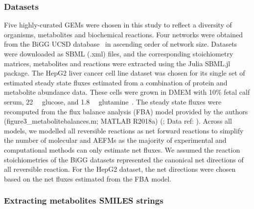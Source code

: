 \documentclass[12pt]{article}
\begin{document}
\subsubsection*{Datasets}

\nocite{OrthJeffreyD2010RaUo}
\nocite{OrthJeffreyD2010RaUoDATASET}
\nocite{BeckerScottA2005Grot}
\nocite{BeckerScottA2005GrotDATASET}
\nocite{BordbarAarash2011iApd}
\nocite{BordbarAarash2011iApdDATASET}
\nocite{ThieleInes2005EMRo}
\nocite{ThieleInes2005EMRoDATASET}

Five highly-curated GEMs were chosen in this study to reflect a diversity
of organisms, metabolites and biochemical reactions. Four networks were
obtained from the BiGG UCSD database~\citep{KingZacharyA2016BMAp} in
ascending order of network size. Datasets were downloaded as SBML (.xml)
files, and the corresponding stoichiometry matrices, metabolites and
reactions were extracted using the Julia SBML.jl package. The HepG2 liver
cancer cell line dataset was chosen for its single set of estimated steady
state fluxes estimated from a combination of protein and metabolite
abundance data. These cells were grown in DMEM with 10\% fetal calf serum,
22\SI{}{\milli\molar} glucose, and 1.8\SI{}{\milli\molar}
glutamine~\citep{NilssonAvlant2020Qaoa}. The steady state fluxes were
recomputed from the flux balance analysis (FBA) model provided by the
authors (figure3\_metabolitebalances.m; MATLAB R2018a)
(\citealt{NilssonAvlant2020Qaoa}; Data ref:
\citealt{NilssonAvlant2020QaoaDATASET}). Across all models, we modelled
all reversible reactions as net forward reactions to simplify the number
of molecular and AEFMs as the majority of experimental and computational
methods can only estimate net fluxes. We assumed the reaction
stoichiometries of the BiGG datasets represented the canonical net
directions of all reversible reaction. For the HepG2 dataset, the net
directions were chosen based on the net fluxes estimated from the FBA
model.

\subsubsection*{Extracting metabolites SMILES strings}
\end{document}
